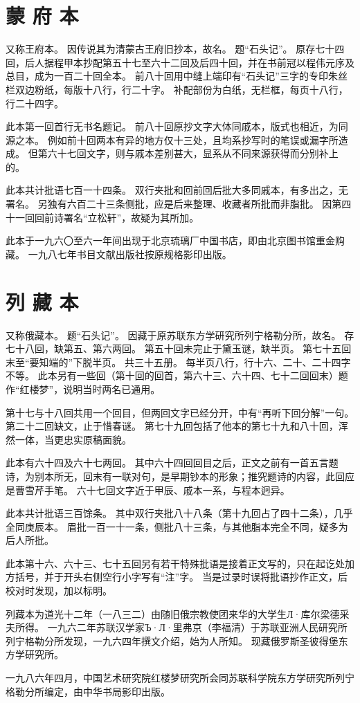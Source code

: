 \section*{蒙 府 本}
又称王府本。
因传说其为清蒙古王府旧抄本，故名。
题“石头记”。
原存七十四回，后人据程甲本抄配第五十七至六十二回及后四十回，并在书前冠以程伟元序及总目，成为一百二十回全本。
前八十回用中缝上端印有“石头记”三字的专印朱丝栏双边粉纸，每版十八行，行二十字。
补配部份为白纸，无栏框，每页十八行，行二十四字。
\par
此本第一回首行无书名题记。
前八十回原抄文字大体同戚本，版式也相近，为同源之本。
例如前十回两本有异的地方仅十三处，且均系抄写时的笔误或漏字所造成。
但第六十七回文字，则与戚本差别甚大，显系从不同来源获得而分别补上的。
\par
此本共计批语七百一十四条。
双行夹批和回前回后批大多同戚本，有多出之，无署名。
另独有六百二十三条侧批，应是后来整理、收藏者所批而非脂批。
因第四十一回回前诗署名“立松轩”，故疑为其所加。
\par
此本于一九六〇至六一年间出现于北京琉璃厂中国书店，即由北京图书馆重金购藏。
一九八七年书目文献出版社按原规格影印出版。
\par
\section*{列 藏 本}

又称俄藏本。
题“石头记”。
因藏于原苏联东方学研究所列宁格勒分所，故名。
存七十八回，缺第五、第六两回。
第五十回未完止于黛玉谜，缺半页。
第七十五回末至“要知端的”下脱半页。
共三十五册。
每半页八行，行十六、二十、二十四字不等。
此本另有一些回（第十回的回首，第六十三、六十四、七十二回回末）题作“红楼梦”，说明当时两名已通用。
\par
第十七与十八回共用一个回目，但两回文字已经分开，中有“再听下回分解”一句。
第二十二回缺文，止于惜春谜。
第七十九回包括了他本的第七十九和八十回，浑然一体，当更忠实原稿面貌。
\par
此本有六十四及六十七两回。
其中六十四回回目之后，正文之前有一首五言题诗，为别本所无，回末有一联对句，是早期钞本的形象；推究题诗的内容，此回应是曹雪芹手笔。
六十七回文字近于甲辰、戚本一系，与程本迥异。
\par
此本共计批语三百馀条。
其中双行夹批八十八条（第十九回占了四十二条），几乎全同庚辰本。
眉批一百一十一条，侧批八十三条，与其他脂本完全不同，疑多为后人所批。
\par
此本第十六、六十三、七十五回另有若干特殊批语是接着正文写的，只在起讫处加方括号，并于开头右侧空行小字写有“注”字。
当是过录时误将批语抄作正文，后校对时发现，加以标明。
\par
列藏本为道光十二年（一八三二）由随旧俄宗教使团来华的大学生Л·库尔梁德采夫所得。
一九六二年苏联汉学家Ъ·Л·里弗京（李福清）于苏联亚洲人民研究所列宁格勒分所发现，一九六四年撰文介绍，始为人所知。
现藏俄罗斯圣彼得堡东方学研究所。
\par
一九八六年四月，中国艺术研究院红楼梦研究所会同苏联科学院东方学研究所列宁格勒分所编定，由中华书局影印出版。
\par


